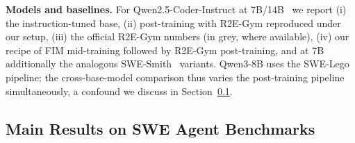 \textbf{Models and baselines.}
For Qwen2.5-Coder-Instruct at 7B/14B~\citep{qwencoder} we report
(i) the instruction-tuned base, (ii) post-training with R2E-Gym
reproduced under our setup, (iii) the official R2E-Gym numbers (in grey,
where available), (iv) our recipe of FIM mid-training followed by
R2E-Gym post-training, and at 7B additionally the analogous
SWE-Smith~\citep{swesmith} variants. Qwen3-8B uses the
SWE-Lego~\citep{swelego} pipeline; the cross-base-model comparison thus
varies the post-training pipeline simultaneously, a confound we discuss
in Section~\ref{sec:exp:main}.

\vspace{-0.5ex}
\subsection{Main Results on SWE Agent Benchmarks}
\label{sec:exp:main}

